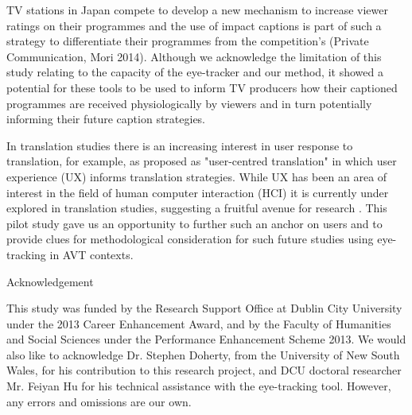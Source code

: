 \documentclass[output=paper]{langsci/langscibook}
\begin{document}
TV stations in Japan compete to develop a new mechanism to increase viewer ratings on their programmes and the use of impact captions is part of such a strategy to differentiate their programmes from the competition's (Private Communication, Mori 2014). Although we acknowledge the limitation of this study relating to the capacity of the eye-tracker and our method, it showed a potential for these tools to be used to inform TV producers how their captioned programmes are received physiologically by viewers and in turn potentially informing their future caption strategies.  



In translation studies there is an increasing interest in user response to translation, for example, as proposed as "user-centred translation" \citep{Suojanen2015} in which user experience (UX) informs translation strategies. While UX has been an area of interest in the field of human computer interaction (HCI) it is currently under explored in translation studies, suggesting a fruitful avenue for research \citep[pp. 312--318]{ohagan2013}. This pilot study gave us an opportunity to further such an anchor on users and to provide clues for methodological consideration for such future studies using eye-tracking in AVT contexts. 


Acknowledgement

This study was funded by the Research Support Office at Dublin City University under the 2013 Career Enhancement Award, and by the Faculty of Humanities and Social Sciences under the Performance Enhancement Scheme 2013. We would also like to acknowledge Dr. Stephen Doherty, from the University of New South Wales, for his contribution to this research project, and DCU doctoral researcher Mr. Feiyan Hu for his technical assistance with the eye-tracking tool. However, any errors and omissions are our own. 
\end{document}
